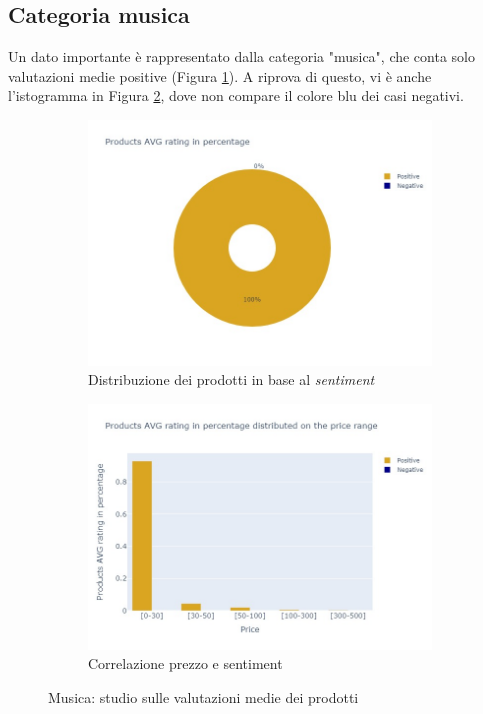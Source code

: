 			
			\subsection{Categoria musica}
				Un dato importante è rappresentato dalla categoria "musica", che conta solo valutazioni medie positive (Figura \ref{fig:pie_music}). A riprova di questo, vi è anche l'istogramma in Figura \ref{fig:priceVSrating_music}, dove non compare il colore blu dei casi negativi. 
					
				\begin{figure} [h]
					\centering
					\begin{subfigure}{0.48\textwidth}
						\includegraphics[width=\textwidth]{Figure/pie_music}
						\caption{Distribuzione dei prodotti in base al \textit{sentiment}}
						\label{fig:pie_music}
					\end{subfigure}
					\begin{subfigure}{0.48\textwidth}
						\includegraphics[width=\textwidth]{Figure/priceVSrating_music}
						\caption{Correlazione prezzo e sentiment}
						\label{fig:priceVSrating_music}
					\end{subfigure}
					\caption{Musica: studio sulle valutazioni medie dei prodotti}\label{fig:price_raiting_music}
				\end{figure}
			
